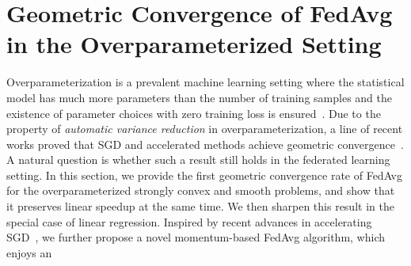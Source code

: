 


\section{Geometric Convergence of FedAvg in the Overparameterized Setting}
\label{sec:app:overparameterized}
Overparameterization is a prevalent machine learning setting where the
statistical model has much more parameters than the number of training samples
and the existence of parameter choices with zero training loss is
ensured~\cite{allen2018convergence,zhang2016understanding}.  Due to the
property of \textit{automatic variance reduction} in overparameterization,  a
line of recent works proved that SGD and accelerated methods achieve geometric
convergence~\cite{ma2017power,moulines2011non,needell2014stochastic,schmidt2013fast,strohmer2009randomized}.
A natural question is whether such a result still holds in the federated
learning setting. 
In this section, we provide the first geometric convergence rate
of FedAvg for the overparameterized strongly convex and smooth problems,
and show that it preserves linear speedup at the same time.  
We then sharpen this result in the special case of
linear regression.
Inspired by recent advances in accelerating SGD~\cite{liu2019accelerating,jain2017accelerating}, 
we further propose a novel momentum-based FedAvg algorithm, which enjoys an
